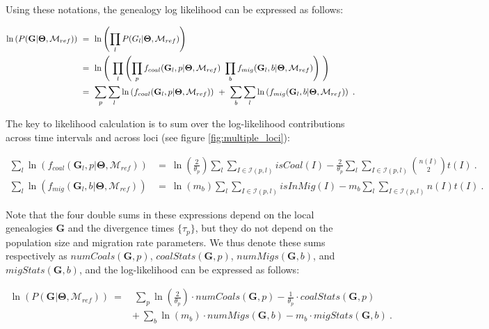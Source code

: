 \documentclass[11pt]{article}
\newcommand{\vect}[1]{\boldsymbol{\mathbf{#1}}}
\newcommand{\M}{\mathcal{M}}
\newcommand{\G}{\vect{G}}
\newcommand{\T}{\vect{\Theta}}
\newcommand{\Ip}{\mathcal{I}(p,l)}
\newcommand{\Ib}{\mathcal{I}(b,l)}
\newcommand{\Mref}{\M_{ref}}
\newcommand{\1}{\mathbbm{1}}
\begin{document}
Using these notations, the genealogy log likelihood can be expressed as follows:
%
%
\begin{small}
\begin{align}
\ln \left( P(\G| \T,\Mref) \right) ~&=~ \ln \left( \prod_{l}  P(G_l| \T,\Mref) \right)  \notag \\ 
%
&=~  \ln \left( ~\prod_{l}  \left( \prod_{p} f_{coal}(\G_l,p|\T,\Mref) ~ \prod_{b} f_{mig}(\G_l,b|\T,\Mref) \right) ~\right) \notag \\ 
%
&=~  \sum_{p}\sum_{l}\ln \left( f_{coal}(\G_l,p|\T,\Mref) \right) ~ + ~ \sum_{b}\sum_{l}\ln \left( f_{mig}(\G_l,b|\T,\Mref) \right)~. 
\label{eqn:ld-details}
\end{align}
\end{small}

The key to likelihood calculation is to sum over the log-likelihood contributions across time intervals and across loci (see figure \ref{fig:multiple_loci}):
%
%
\begin{small}
\begin{align}
\sum_{l}\ln \left( f_{coal}(\G_l,p|\T,\Mref) \right) &=~ %
\ln\left( \frac{2}{\theta_p}\right) \sum_{l} \sum_{I \in \Ip} isCoal(I)  - \frac{2}{\theta_p} \sum_{l} \sum_{I \in \Ip}{n(I)\choose 2}t(I) ~.
\label{eqn:ld-coal-stats}\\
\sum_{l}\ln \left( f_{mig}(\G_l,b|\T,\Mref) \right) &=~ %
\ln\left( m_b\right) \sum_{l} \sum_{I \in \Ip} isInMig(I)  - m_b \sum_{l} \sum_{I \in \Ip}n(I) t(I) ~.
\label{eqn:ld-mig-stats}
\end{align}
\end{small}

Note that the four double sums in these expressions depend on the local genealogies $\G$ and the divergence times $\{\tau_p\}$, but they do not depend on the population size and migration rate parameters. We thus denote these sums respectively as $numCoals(\G,p)$, $coalStats(\G,p)$,  $numMigs(\G,b)$, and $migStats(\G,b)$, and the log-likelihood can be expressed as follows:
%
%
\begin{small}
\begin{align}
\ln \left( P(\G| \T,\Mref) \right) ~=&~ \sum_{p}  \ln\left( \frac{2}{\theta_p}\right)\cdot numCoals(\G,p) - \frac{1}{\theta_p}\cdot coalStats(\G,p) \\
& +~ \sum_{b}  \ln\left( m_b\right)\cdot numMigs(\G,b) - m_b \cdot migStats(\G,b) ~. 
\label{eqn:ld-final}
\end{align}
\end{small}
\end{document}
